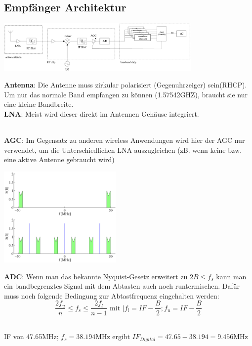 
\subsection{Empfänger Architektur}
	\begin{minipage}{10cm}
		\includegraphics[width=10cm]{./bilder/GPS-Empfangsarchitecture.png}
	\end{minipage}
	\begin{minipage}{8cm}
    	\textbf{Antenna}: Die Antenne muss zirkular polarisiert (Gegenuhrzeiger)
    	sein(RHCP). Um nur das normale Band empfangen zu können (1.57542GHZ),
    	braucht sie nur eine kleine Bandbreite. \\
    	\textbf{LNA}: Meist wird dieser direkt im Antennen Gehäuse integriert.
    \end{minipage}\\
	\textbf{AGC}: Im Gegensatz zu anderen wireless Anwendungen wird hier der
    	AGC nur verwendet, um die Unterschiedlichen LNA auszugleichen (zB. wenn
    	keine bzw. eine aktive Antenne gebraucht wird)\\
    \begin{minipage}{8cm}
    	\includegraphics[width=6cm]{./bilder/GPS-Downsampling.png}
    \end{minipage}
	\begin{minipage}{9cm}
	    \textbf{ADC}: Wenn man das bekannte Nyquist-Gesetz erweitert zu $2B\leq
	    f_s$ kann man ein bandbegrenztes Signal mit dem Abtasten auch noch
	    runtermischen. Dafür muss noch folgende Bedingung zur Abtastfrequenz
	    eingehalten werden:\\
	    $$\frac{2f_u}{n}\leq f_s\leq\frac{2f_l}{n-1}\text{ mit }|
	    f_l=IF-\frac{B}{2};f_u=IF-\frac{B}{2}$$
	   	
    \end{minipage}\\
	IF von 47.65MHz; $f_s=38.194$MHz ergibt $IF_{Digital}=47.65-38.194=9.456$MHz
    
